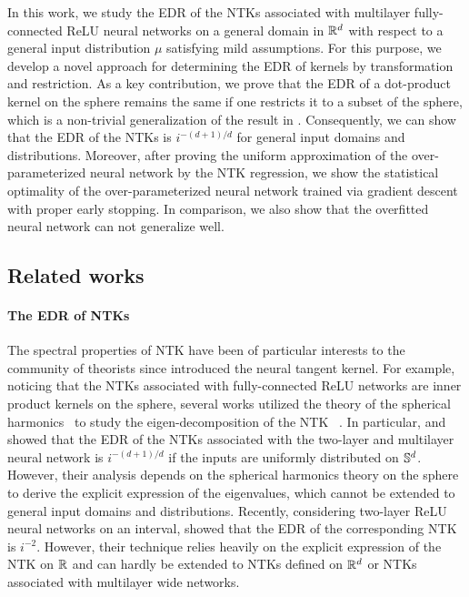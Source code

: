 In this work, we study the EDR of the NTKs associated with multilayer fully-connected ReLU neural networks
on a general domain in $\mathbb{R}^d$ with respect to a general input distribution $\mu$ satisfying mild assumptions.
For this purpose, we develop a novel approach for determining the EDR of kernels by transformation and restriction.
As a key contribution, we prove that the EDR of a dot-product kernel on the sphere remains the same if one restricts it to a subset of the sphere,
which is a non-trivial generalization of the result in \citet{widom1963_AsymptoticBehavior}.
Consequently, we can show that the EDR of the NTKs is $i^{-(d+1)/d}$ for general input domains and distributions.
Moreover, after proving the uniform approximation of the over-parameterized neural network by the NTK regression,
we show the statistical optimality of the over-parameterized neural network trained via gradient descent with proper early stopping.
In comparison, we also show that the overfitted neural network can not generalize well.

\subsection{Related works}

\paragraph{The EDR of NTKs}
The spectral properties of NTK have been of particular interests to the community of theorists since \citet{jacot2018_NeuralTangent} introduced the neural tangent kernel.
For example, noticing that the NTKs associated with fully-connected ReLU networks are inner product kernels on the sphere,
several works utilized the theory of the spherical harmonics~\citep{dai2013_ApproximationTheory,azevedo2014_SharpEstimates} to study the eigen-decomposition of the NTK
~\citep{bietti2019_InductiveBias,ronen2019_ConvergenceRate,geifman2020_SimilarityLaplace,chen2020_DeepNeural,bietti2020_DeepEquals}.
In particular, \citet{bietti2019_InductiveBias} and \citet{bietti2020_DeepEquals} showed that the EDR of
the NTKs associated with the two-layer and multilayer neural network is $i^{-(d+1)/d}$ if the inputs are uniformly distributed on $\mathbb{S}^d$.
However, their analysis depends on the spherical harmonics theory on the sphere to derive the explicit expression of the eigenvalues,
which cannot be extended to general input domains and distributions.
Recently, considering two-layer ReLU neural networks on an interval,
\citet{lai2023_GeneralizationAbility} showed that the EDR of the corresponding NTK is $i^{-2}$.
However, their technique relies heavily on the explicit expression of the NTK on $\mathbb{R}$ and can hardly be extended to NTKs defined on $\mathbb{R}^d$
or NTKs associated with multilayer wide networks.

